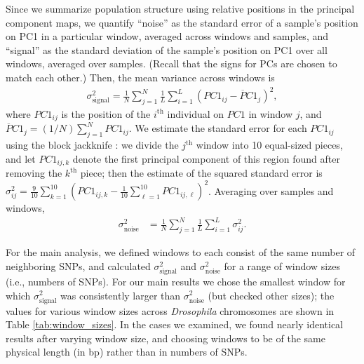 \documentclass[11pt, oneside]{article}   	%
\newcommand{\pcone}{PC1}
\begin{document}
Since we summarize population structure using relative positions in the principal component maps,
we quantify ``noise'' as the standard error of a sample's position on PC1 in a particular window,
averaged across windows and samples,
and ``signal'' as the standard deviation of the sample's position on PC1 over all windows,
averaged over samples.
(Recall that the signs for PCs are chosen to match each other.)
Then, the mean variance across windows is
\begin{align*}
    \sigma_\text{signal}^2
    = 
    \frac{1}{N} \sum_{j=1}^{N}
        \frac{1}{L}\sum_{i=1}^{L}\left ( \pcone_{ij} -\overline\pcone_{j} \right )^{2} ,
\end{align*}
where $\pcone_{ij}$ is the position of the $i^\text{th}$ individual on $\pcone$ in window $j$,
and $\overline\pcone_j = (1/N) \sum_{j=1}^N \pcone_{ij}$.
We estimate the standard error for each $\pcone_{ij}$ using the block jackknife \citep{efron1982jackknife,busing1999deletem}:
we divide the $j^\text{th}$ window into 10 equal-sized pieces,
and let $\pcone_{ij,k}$ denote the first principal component of this region found after removing the $k^\text{th}$ piece;
then the estimate of the squared standard error is
$\sigma^2_{ij} = \frac{9}{10} \sum_{k=1}^{10} ( \pcone_{ij,k} - \frac{1}{10} \sum_{\ell=1}^{10} \pcone_{ij,\ell} )^2$.
Averaging over samples and windows,
\begin{align*}
    \sigma^2_\text{noise}
    &=
    \frac{1}{N} \sum_{j=1}^{N} \frac{1}{L}\sum_{i=1}^{L} \sigma^2_{ij} .
\end{align*}

For the main analysis, we defined windows to each consist of the same number of neighboring SNPs,
and calculated $\sigma^2_\text{signal}$ and $\sigma^2_\text{noise}$
for a range of window sizes (i.e., numbers of SNPs).
For our main results we
chose the smallest window for which $\sigma^2_\text{signal}$ was consistently larger than $\sigma^2_\text{noise}$ (but checked other sizes);
the values for various window sizes across \textit{Drosophila} chromosomes are shown in Table \ref{tab:window_sizes}.
In the cases we examined, we found nearly identical results after varying window size,
and choosing windows to be of the same physical length (in bp) rather than in numbers of SNPs.
\end{document}
